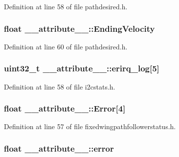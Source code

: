 \-Definition at line 58 of file pathdesired.\-h.

\hypertarget{struct____attribute_____a7f9689f3df16f156dc33db648f8469f0}{
\subsubsection[{\-Ending\-Velocity}]{\setlength{\rightskip}{0pt plus 5cm}float {\bf \-\_\-\-\_\-attribute\-\_\-\-\_\-\-::\-Ending\-Velocity}}}\label{struct____attribute_____a7f9689f3df16f156dc33db648f8469f0}


\-Definition at line 60 of file pathdesired.\-h.

\hypertarget{struct____attribute_____a398dadb88f40da0483b9ea312d58a414}{
\subsubsection[{erirq\-\_\-log}]{\setlength{\rightskip}{0pt plus 5cm}uint32\-\_\-t {\bf \-\_\-\-\_\-attribute\-\_\-\-\_\-\-::erirq\-\_\-log}\mbox{[}5\mbox{]}}}\label{struct____attribute_____a398dadb88f40da0483b9ea312d58a414}


\-Definition at line 58 of file i2cstats.\-h.

\hypertarget{struct____attribute_____a77e0a7ccf8a14cdc6a31326845221e46}{
\subsubsection[{\-Error}]{\setlength{\rightskip}{0pt plus 5cm}float {\bf \-\_\-\-\_\-attribute\-\_\-\-\_\-\-::\-Error}\mbox{[}4\mbox{]}}}\label{struct____attribute_____a77e0a7ccf8a14cdc6a31326845221e46}


\-Definition at line 57 of file fixedwingpathfollowerstatus.\-h.

\hypertarget{struct____attribute_____ae3699ce68f1527145cc32efa7538e479}{
\subsubsection[{error}]{\setlength{\rightskip}{0pt plus 5cm}float {\bf \-\_\-\-\_\-attribute\-\_\-\-\_\-\-::error}}}\label{struct____attribute_____ae3699ce68f1527145cc32efa7538e479}


